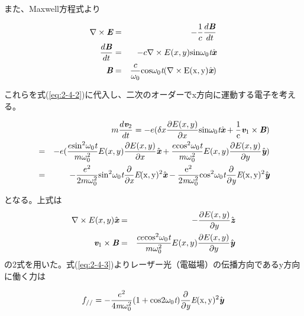 \documentclass[a4paper,11pt,titlepage]{jarticle}
\numberwithin{equation}{section} %
\begin{document}
  また、Maxwell方程式より
  
  \begin{eqnarray}
    \nabla \times \textit{\textbf{E}} &=& - \frac{1}{c} \frac{d \textit{\textbf{B}}}{dt}\\
    \frac{d \textit{\textbf{B}}}{dt} &=& -c \nabla \times E(x,y) \rm{sin} \omega _0 \textit{t} \hat{\textit{\textbf{x}}}\\
    \textit{\textbf{B}} &=& \frac{c}{\omega _0} \rm{cos}\omega _0 \textit{t} \lparen \nabla \times E(x,y) \hat{\textit{\textbf{x}}} \rparen
  \end{eqnarray}
  
  これらを式(\ref{eq:2-4-2})に代入し、二次のオーダーでx方向に運動する電子を考える。
  
  \begin{eqnarray}
    && m \frac{d \textit{\textbf{v}}_2}{dt} = -e \lparen \delta x \frac{\partial E(x,y)}{\partial x} \rm{sin} \omega _0 \textit{t} \hat{\textit{\textbf{x}}} + \frac{1}{c} \textit{\textbf{v}}_1 \times \textit{\textbf{B}} \rparen\\
    &=& -e \lparen \frac{e \rm{sin^2} \omega _0 \textit{t}}{m \omega _0^2} E(x,y) \frac{\partial E(x,y)}{\partial x}  \hat{\textit{\textbf{x}}} + \frac{e \rm{cos^2} \omega _0 \textit{t}}{m \omega _0^2} E(x,y) \frac{\partial E(x,y)}{\partial y} \hat{\textit{\textbf{y}}}\rparen\\
    \label{eq:2-4-3}
    &=& - \frac{e^2 }{2 m \omega _0^2} \rm{sin^2} \omega _0 \textit{t} \frac{\partial }{\partial \textit{x}} \textit{E}(x,y)^2 \hat{\textit{\textbf{x}}} - \frac{e^2 }{2 \textit{m} \omega _0^2} \rm{cos^2} \omega _0 \textit{t} \frac{\partial }{\partial \textit{y}}\textit{E}(x,y)^2 \hat{\textit{\textbf{y}}}
  \end{eqnarray}
  
  となる。上式は
  \begin{eqnarray}
    \nabla \times E(x,y) \hat{\textit{\textbf{x}}} &=& -\frac{\partial E(x,y)}{\partial y}\hat{\textit{\textbf{z}}}\\
    \textit{\textbf{v}}_1 \times \textit{\textbf{B}} &=& \frac{ce \rm{cos^2} \omega _0 \textit{t}}{m \omega _0^2} E(x,y) \frac{\partial E(x,y)}{\partial y} \hat{\textit{\textbf{y}}}
  \end{eqnarray}
  の2式を用いた。式(\ref{eq:2-4-3})よりレーザー光（電磁場）の伝播方向であるy方向に働く力は
  
  \begin{eqnarray}
    f_{//}=- \frac{e^2 }{4 \textit{m} \omega _0^2}  (1 + \rm{cos} 2 \omega _0 \textit{t} )\frac{\partial }{\partial \textit{y}}\textit{E}(x,y)^2 \hat{\textit{\textbf{y}}}
  \end{eqnarray}
  
\end{document}
